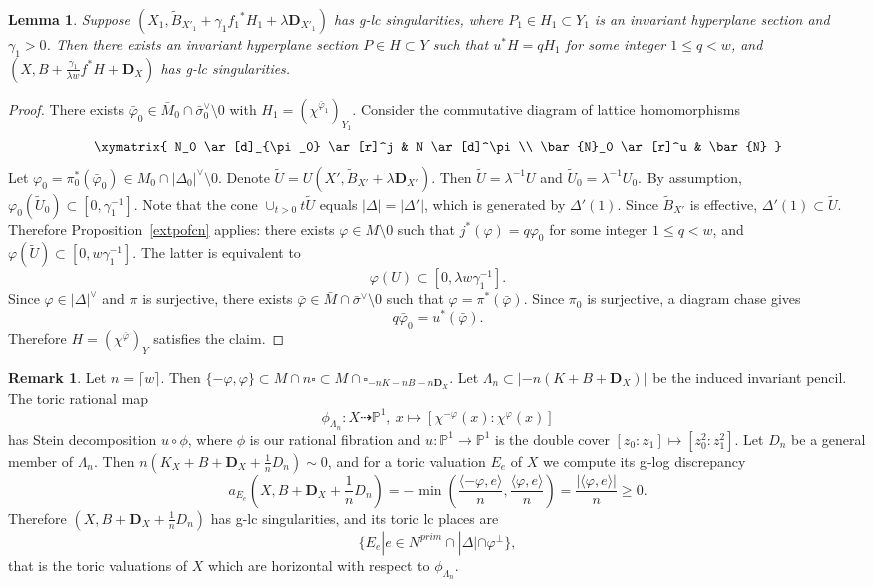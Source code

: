 \documentclass[12pt,twoside]{amsart}
\newcommand{\bP}{{\mathbb P}} %
\newcommand{\bD}{{\mathbf D}}
\theoremstyle{plain}
\newtheorem{lem}[thm]{Lemma}
\theoremstyle{definition}
\newtheorem{rem}[thm]{Remark}
\theoremstyle{remark}
\begin{document}
\begin{lem}\label{exthyp}
	Suppose $(X_1,\tilde{B}_{X'_1}+\gamma_1{f_1}^*H_1+\lambda \bD_{X'_1})$ has g-lc
	singularities, where $P_1\in H_1\subset Y_1$ is an invariant hyperplane section
	and $\gamma_1>0$. Then there exists an invariant hyperplane section 
	$P\in H\subset Y$ such that $u^*H=qH_1$ for some integer $1\le q<w$, and 
	$(X,B+\frac{\gamma_1}{\lambda w}f^*H+\bD_X)$ has g-lc singularities.
\end{lem}

\begin{proof}
	There exists $\bar{\varphi}_0 \in \bar{M}_0 \cap \bar{\sigma}_0^\vee\setminus 0$ with 
	$H_1=(\chi^{\bar{\varphi}_1})_{Y_1}$. Consider the commutative diagram
	of lattice homomorphisms
	\[ \xymatrix{
		N_0  \ar[d]_{\pi_0}   \ar[r]^j   &   N  \ar[d]^\pi  \\
		\bar{N}_0 \ar[r]^u   & \bar{N}
	} \]
	Let $\varphi_0=\pi_0^*(\bar{\varphi}_0)\in M_0\cap |\Delta_0|^\vee\setminus 0$.
	Denote $\tilde{U}=U(X',\tilde{B}_{X'}+\lambda \bD_{X'})$. Then 
	$\tilde{U}=\lambda^{-1}U$ and $\tilde{U}_0=\lambda^{-1}U_0$.
	By assumption, $\varphi_0(\tilde{U}_0)\subset [0,\gamma_1^{-1}]$.
	Note that the cone $\cup_{t>0} t\tilde{U}$ equals $|\Delta|=|\Delta'|$, which is 
	generated by $\Delta'(1)$. Since $\tilde{B}_{X'}$ is effective, 
	$\Delta'(1)\subset \tilde{U}$. Therefore Proposition~\ref{extpofcn}
	applies: there exists $\varphi\in M\setminus 0$ such that $j^*(\varphi)=q\varphi_0$
	for some integer $1\le q <w$, and $\varphi(\tilde{U})\subset [0,w\gamma_1^{-1}]$.
	The latter is equivalent to
	$$
	\varphi(U)\subset [0,\lambda w\gamma_1^{-1}].
	$$
	Since $\varphi\in |\Delta|^\vee$ and $\pi$ is surjective, there exists 
	$\bar{\varphi}\in \bar{M}\cap\bar{\sigma}^\vee\setminus 0$ such that $\varphi=\pi^*(\bar{\varphi})$.
	Since $\pi_0$ is surjective, a diagram chase gives 
	$$
	q\bar{\varphi}_0=u^*(\bar{\varphi}).
	$$
	Therefore $H=(\chi^{\bar{\varphi}} )_Y$ satisfies the claim.
\end{proof}

\begin{rem}
	Let $n=\lceil w\rceil$. Then $\{-\varphi,\varphi\} \subset  M\cap n\square\subset M\cap \square_{-nK-nB-n\bD_X}$.
	Let $\Lambda_n \subset |-n(K+B+\bD_X)|$ be the induced invariant pencil. The toric rational map
	$$
	\phi_{\Lambda_n}\colon  X\dashrightarrow \bP^1, \ x \mapsto [\chi^{-\varphi}(x): \chi^{\varphi}(x)]
	$$
	has Stein decomposition $u\circ \phi$, where $\phi$ is our rational fibration and 
	$u\colon \bP^1\to \bP^1$ is the double cover $[z_0:z_1]\mapsto [z_0^2:z_1^2]$.
	Let $D_n$ be a general member of 
	$\Lambda_n$. Then $n(K_X+B+\bD_X+\frac{1}{n}D_n)\sim 0$, and for a toric valuation 
	$E_e$ of $X$ we compute its g-log discrepancy 
	$$
	a_{E_e}(X,B+\bD_X+\frac{1}{n}D_n)=-\min(\frac{\langle -\varphi,e\rangle}{n},\frac{\langle \varphi,e\rangle}{n} )=
	\frac{|\langle \varphi,e\rangle|}{n}\ge 0.
	$$
	Therefore $(X,B+\bD_X+\frac{1}{n}D_n)$ has g-lc singularities, and its toric lc places are 
	$$
	\{E_e | e\in N^{prim}\cap |\Delta|\cap \varphi^\perp \},
	$$
	that is the toric valuations of $X$ which are horizontal with respect to $\phi_{\Lambda_n}$.
	
\end{rem}
\end{document}
